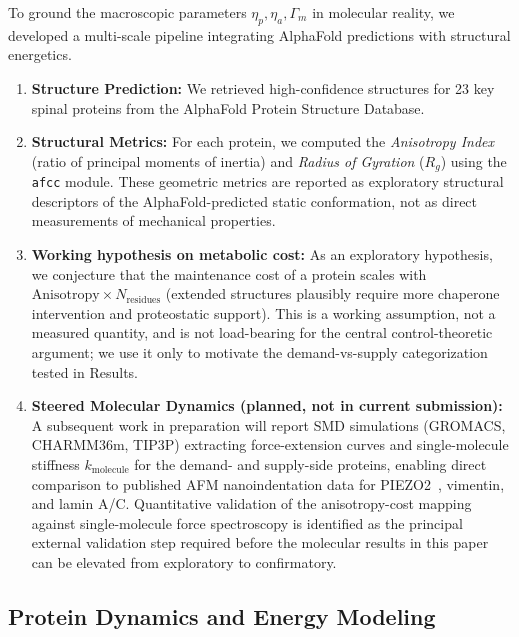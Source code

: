 To ground the macroscopic parameters $\eta_p, \eta_a, \Gamma_m$ in molecular reality, we developed a multi-scale pipeline integrating AlphaFold predictions with structural energetics.
\begin{enumerate}
    \item \textbf{Structure Prediction:} We retrieved high-confidence structures for 23 key spinal proteins from the AlphaFold Protein Structure Database.
    \item \textbf{Structural Metrics:} For each protein, we computed the \emph{Anisotropy Index} (ratio of principal moments of inertia) and \emph{Radius of Gyration} ($R_g$) using the \texttt{afcc} module. These geometric metrics are reported as exploratory structural descriptors of the AlphaFold-predicted static conformation, not as direct measurements of mechanical properties.
    \item \textbf{Working hypothesis on metabolic cost:} As an exploratory hypothesis, we conjecture that the maintenance cost of a protein scales with $\text{Anisotropy} \times N_{\text{residues}}$ (extended structures plausibly require more chaperone intervention and proteostatic support). This is a working assumption, not a measured quantity, and is not load-bearing for the central control-theoretic argument; we use it only to motivate the demand-vs-supply categorization tested in Results.
    \item \textbf{Steered Molecular Dynamics (planned, not in current submission):} A subsequent work in preparation will report SMD simulations (GROMACS, CHARMM36m, TIP3P) extracting force-extension curves and single-molecule stiffness $k_{\text{molecule}}$ for the demand- and supply-side proteins, enabling direct comparison to published AFM nanoindentation data for PIEZO2~\cite{coste2010piezo}, vimentin, and lamin A/C. Quantitative validation of the anisotropy-cost mapping against single-molecule force spectroscopy is identified as the principal external validation step required before the molecular results in this paper can be elevated from exploratory to confirmatory.
\end{enumerate}

\subsection{Protein Dynamics and Energy Modeling}


